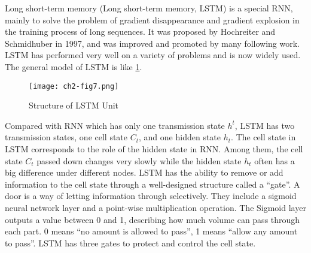 Long short-term memory (Long short-term memory, LSTM) is a special RNN, mainly to solve the problem of gradient disappearance and gradient explosion in the training process of long sequences. It was proposed by Hochreiter and Schmidhuber in 1997\cite{lstm1997}, and was improved and promoted by many following work. LSTM has performed very well on a variety of problems and is now widely used. The general model of LSTM is like \figurename{\ref{ch2-fig7}}.

\begin{figure}[h]
	\centering
	\texttt{[image: ch2-fig7.png]}
	\caption{Structure of LSTM Unit}\label{ch2-fig7}
\end{figure}


Compared with RNN which has only one transmission state \(h^t\), LSTM has two transmission states, one cell state \(C_t\), and one hidden state \(h_t\). The cell state in LSTM corresponds to the role of the hidden state in RNN. Among them, the cell state \(C_t\) passed down changes very slowly while the hidden state \(h_t\) often has a big difference under different nodes. LSTM has the ability to remove or add information to the cell state through a well-designed structure called a ``gate''. A door is a way of letting information through selectively. They include a sigmoid neural network layer and a point-wise multiplication operation. The Sigmoid layer outputs a value between 0 and 1, describing how much volume can pass through each part. 0 means ``no amount is allowed to pass'', 1 means ``allow any amount to pass''. LSTM has three gates to protect and control the cell state.

